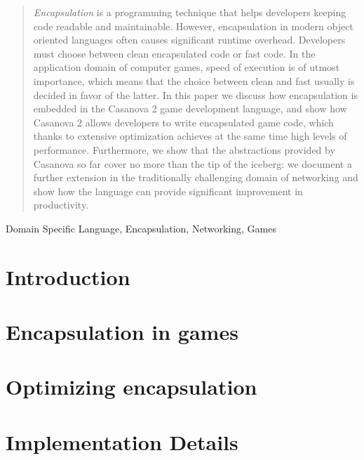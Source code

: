 \documentclass[preprint,12pt]{elsarticle}
\begin{document}
\begin{frontmatter}



\begin{abstract}
\textit{Encapsulation} is a programming technique that helps developers keeping code readable and maintainable. However, encapsulation in modern object oriented languages often causes significant runtime overhead. Developers must choose between clean encapsulated code or fast code. In the application domain of computer games, speed of execution is of utmost importance, which means that the choice between clean and fast usually is decided in favor of the latter. In this paper we discuss how encapsulation is embedded in the Casanova 2 game development language, and show how Casanova 2 allows developers to write encapsulated game code, which thanks to extensive optimization achieves at the same time high levels of performance. Furthermore, we show that the abstractions provided by Casanova so far cover no more than the tip of the iceberg: we document a further extension in the traditionally challenging domain of networking and show how the language can provide significant improvement in productivity.
\end{abstract}

\begin{keyword}
Domain Specific Language, Encapsulation, Networking, Games
\end{keyword}

\end{frontmatter}


\section{Introduction}
\label{sec:introduction}


\section{Encapsulation in games}
\label{sec:the_problem}


\section{Optimizing encapsulation}
\label{sec:idea}


\section{Implementation Details}
\label{sec:details}

\end{document}
